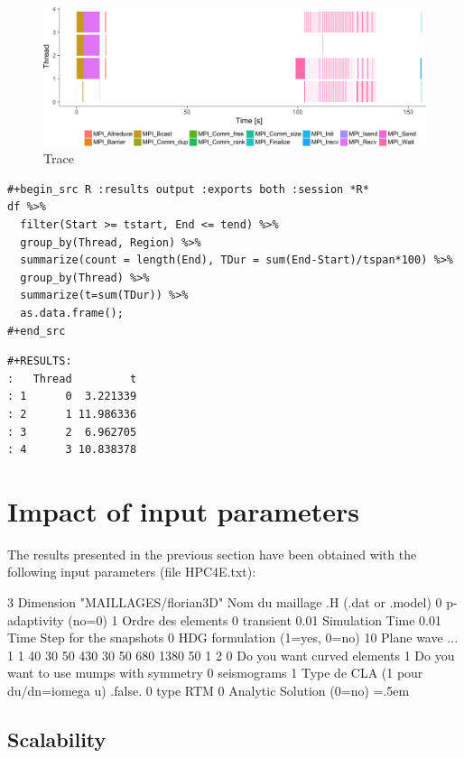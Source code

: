 \documentclass[10pt,twoside]{article}   	%
\newenvironment{cverbatim}
 {\SaveVerbatim{cverb}}
 {\endSaveVerbatim
  \flushleft\fboxrule=0pt\fboxsep=.5em
  \colorbox{cverbbg}{\BUseVerbatim{cverb}}%
  \endflushleft
}
\begin{document}
\begin{figure}[H]
\centering
\includegraphics[width=13cm]{IMAGES/tool1}
\caption{Trace}
\label{fig:5}
\end{figure}

\lstset{language=R}
\begin{lstlisting}[caption=Code in R that analyses the CVS file (written in emacs using org mode)]
#+begin_src R :results output :exports both :session *R* 
df %>%
  filter(Start >= tstart, End <= tend) %>%
  group_by(Thread, Region) %>%
  summarize(count = length(End), TDur = sum(End-Start)/tspan*100) %>%
  group_by(Thread) %>%
  summarize(t=sum(TDur)) %>%
  as.data.frame();
#+end_src
\end{lstlisting}

\lstset{language=R}
\begin{lstlisting}[caption=Results]
#+RESULTS:
:   Thread         t
: 1      0  3.221339
: 2      1 11.986336
: 3      2  6.962705
: 4      3 10.838378
\end{lstlisting}


\section{Impact of input parameters}

The results presented in the previous section have been obtained with the following input parameters (file HPC4E.txt):

\begin{cverbatim}
3 Dimension
"MAILLAGES/florian3D" Nom du maillage
.H (.dat or .model)
0 p-adaptivity (no=0)
1 Ordre des elements
0 transient
0.01 Simulation Time
0.01 Time Step for the snapshots
0 HDG formulation (1=yes, 0=no)
10 Plane wave ...
1
1
40 30 50
430 30 50
680 1380 50
1
2
0 Do you want curved elements
1 Do you want to use mumps with symmetry
0 seismograms 
1 Type de CLA (1 pour du/dn=iomega u)
.false.
0 type RTM
0 Analytic Solution (0=no)
\end{cverbatim}


\subsection{Scalability}
\end{document}
